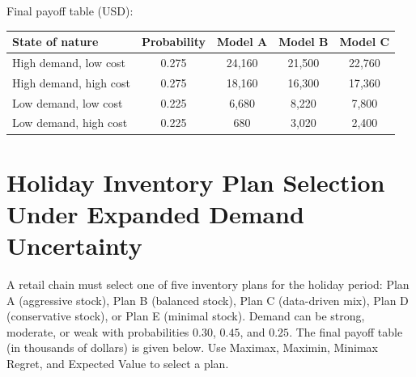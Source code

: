 \begin{ExamProblems}
\begin{center}
		\end{center}
		
		Final payoff table (USD):
		\begin{center}
			\begin{tabular}{l c c c c}
				\toprule
				State of nature & Probability & Model A & Model B & Model C \\
				\midrule
				High demand, low cost & 0.275 & 24{,}160 & 21{,}500 & 22{,}760 \\
				High demand, high cost & 0.275 & 18{,}160 & 16{,}300 & 17{,}360 \\
				Low demand, low cost & 0.225 & 6{,}680 & 8{,}220 & 7{,}800 \\
				Low demand, high cost & 0.225 & 680 & 3{,}020 & 2{,}400 \\
				\bottomrule
			\end{tabular}
		\end{center}
		
		\item
		\section{Holiday Inventory Plan Selection Under Expanded Demand Uncertainty}
		A retail chain must select one of five inventory plans for the holiday period: Plan A (aggressive stock),
		Plan B (balanced stock), Plan C (data-driven mix), Plan D (conservative stock), or Plan E (minimal stock).
		Demand can be strong, moderate, or weak with probabilities $0.30$, $0.45$, and $0.25$.
		The final payoff table (in thousands of dollars) is given below. Use Maximax, Maximin, Minimax Regret,
		and Expected Value to select a plan.
		

\end{ExamProblems}
